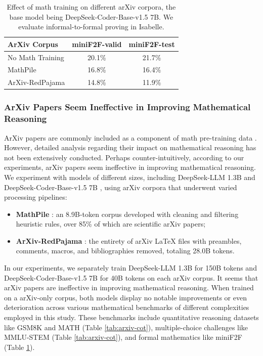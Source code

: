 \begingroup
\setlength{\tabcolsep}{3pt} 
\renewcommand{\arraystretch}{1} 

\begin{table}[t!]
    \centering
\begin{small}
\begin{tabular}{lcc} 
\toprule
ArXiv Corpus      & miniF2F-valid & miniF2F-test  \\ 
\midrule
No Math Training &   20.1\%        & 21.7\%            \\ 
\midrule
MathPile         & 16.8\%        & 16.4\%        \\
ArXiv-RedPajama  & 14.8\%        & 11.9\%        \\
\bottomrule
\end{tabular}
\end{small}
    \caption{
    Effect of math training on different arXiv corpora, the base model being DeepSeek-Coder-Base-v1.5 7B.
    We evaluate informal-to-formal proving in Isabelle.
    }
    \label{tab:arxiv_atp}
    \vspace{-0.1in}
\end{table}
\endgroup

\subsubsection{ArXiv Papers Seem Ineffective in Improving Mathematical Reasoning}

ArXiv papers are commonly included as a component of math pre-training data \citep{minerva,gpt-f,llemma,mathpile}.
However, detailed analysis regarding their impact on mathematical reasoning has not been extensively conducted.
Perhaps counter-intuitively, according to our experiments, arXiv papers seem ineffective in improving mathematical reasoning.
We experiment with models of different sizes, including DeepSeek-LLM 1.3B and DeepSeek-Coder-Base-v1.5 7B \citep{deepseek-coder}, using arXiv corpora that underwent varied processing pipelines:
\begin{itemize}[topsep=0pt]
    \item \textbf{MathPile} \citep{mathpile}:
    an 8.9B-token corpus developed with cleaning and filtering heuristic rules, over 85\% of which are scientific arXiv papers;
    \item \textbf{ArXiv-RedPajama} \citep{redpajama}:
    the entirety of arXiv LaTeX files with preambles, comments, macros, and bibliographies removed, totaling 28.0B tokens.
\end{itemize}
\noindent
In our experiments, we separately train DeepSeek-LLM 1.3B for 150B tokens and DeepSeek-Coder-Base-v1.5 7B for 40B tokens on each arXiv corpus. It seems that arXiv papers are ineffective in improving mathematical reasoning.
When trained on a arXiv-only corpus, both models display no notable improvements or even deterioration across various mathematical benchmarks of different complexities employed in this study.
These benchmarks include quantitative reasoning datasets like GSM8K and MATH (Table \ref{tab:arxiv-cot}), multiple-choice challenges like MMLU-STEM (Table \ref{tab:arxiv-cot}), and formal mathematics like miniF2F (Table \ref{tab:arxiv_atp}).

